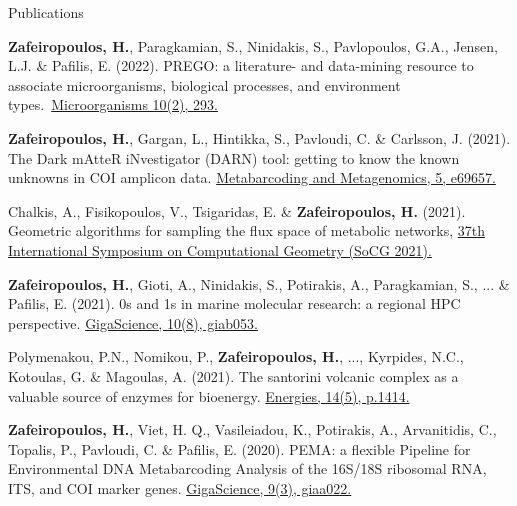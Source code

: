 \documentclass{beamer}
\begin{document}
   \begin{frame}[label=bibliography]{Publications}
      
      \begin{thebibliography}{9}

         \tiny
            \textbf{Zafeiropoulos, H.}, Paragkamian, S., Ninidakis, S., Pavlopoulos, G.A., Jensen, L.J. \& Pafilis, E. (2022). PREGO: a literature- and data-mining resource to associate microorganisms, biological processes, and environment types.~\href{https://www.mdpi.com/1469654}{Microorganisms  10(2), 293.}

         \tiny
            \textbf{Zafeiropoulos, H.}, Gargan, L., Hintikka, S., Pavloudi, C. \& Carlsson, J. (2021). The Dark mAtteR iNvestigator (DARN) tool: getting to know the known unknowns in COI amplicon data. \href{https://mbmg.pensoft.net/article/69657/list/9/}{Metabarcoding and Metagenomics, 5, e69657.}

         \tiny
            Chalkis, A., Fisikopoulos, V., Tsigaridas, E. \& \textbf{Zafeiropoulos, H.} (2021). Geometric algorithms for sampling the flux space of metabolic networks, \href{ https://drops.dagstuhl.de/opus/volltexte/2021/13820/}{37th International Symposium on Computational Geometry (SoCG 2021).}

         \tiny
            \textbf{Zafeiropoulos, H.}, Gioti, A., Ninidakis, S., Potirakis, A., Paragkamian, S., ... \& Pafilis, E. (2021). 0s and 1s in marine molecular research: a regional HPC perspective. \href{https://academic.oup.com/gigascience/article/10/8/giab053/6353916}{GigaScience, 10(8), giab053.}

         \tiny
            Polymenakou, P.N., Nomikou, P., \textbf{Zafeiropoulos, H.}, ..., Kyrpides, N.C., Kotoulas, G. \& Magoulas, A. (2021). 
            The santorini volcanic complex as a valuable source of enzymes for bioenergy. 
            \href{https://doi.org/10.3390/en14051414}{Energies, 14(5), p.1414.}

         \tiny
         \textbf{Zafeiropoulos, H.}, Viet, H. Q., Vasileiadou, K., Potirakis, A., Arvanitidis, C., Topalis, P., Pavloudi, C. \& Pafilis, E. (2020). PEMA: a flexible Pipeline for Environmental DNA Metabarcoding Analysis of the 16S/18S ribosomal RNA, ITS, and COI marker genes. \href{https://academic.oup.com/gigascience/article/9/3/giaa022/5803335}{GigaScience, 9(3), giaa022.}
 

\end{thebibliography}
\end{frame}
\end{document}
